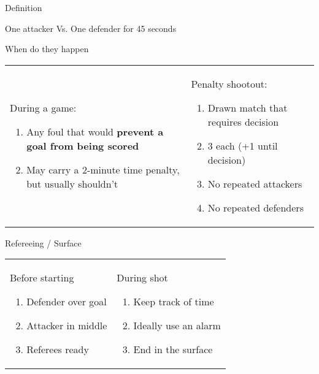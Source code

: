 \begin{frame}{Definition}
    \begin{center}
        One attacker Vs. One defender for 45 seconds
    \end{center}
\end{frame}

\begin{frame}{When do they happen}
    \begin{tabular}{ll}
        \parbox{0.5\textwidth} { During a game:

            \begin{enumerate}
                \item Any foul that would \textbf{prevent a goal from being scored}
                \item May carry a 2-minute time penalty, but usually shouldn't
            \end{enumerate}
        }
         &
        \parbox{0.5\textwidth} { Penalty shootout:

            \begin{enumerate}
                \item Drawn match that requires decision
                \item 3 each (+1 until decision)
                \item No repeated attackers
                \item No repeated defenders
            \end{enumerate}
        }
    \end{tabular}
\end{frame}

\begin{frame}{Refereeing / Surface}
    \begin{tabular}{ll}
        \parbox{0.5\textwidth} {
            \begin{center}
                Before starting
            \end{center}
            \begin{enumerate}
                \item Defender over goal
                \item Attacker in middle
                \item Referees ready
            \end{enumerate}
        }
         &
        \parbox{0.5\textwidth} {
            \begin{center}
                During shot
            \end{center}
            \begin{enumerate}
                \item Keep track of time
                \item Ideally use an alarm
                \item End in the surface
            \end{enumerate}
        }
    \end{tabular}
\end{frame}

